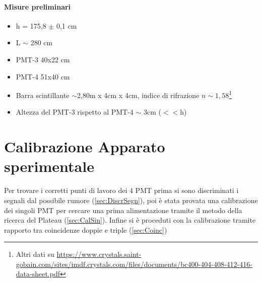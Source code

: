 \documentclass[a4paper]{article}
\begin{document}
\paragraph{Misure preliminari}
\begin{itemize}
\item h = 175,8 $\pm$ 0,1 cm
\item L $\sim$ 280 cm
\item PMT-3 40x22 cm
\item PMT-4 51x40 cm
\item Barra scintillante $\sim$2,80m x 4cm x 4cm, indice di rifrazione $n\sim 1,58$\footnote{Altri dati su \url{https://www.crystals.saint-gobain.com/sites/imdf.crystals.com/files/documents/bc400-404-408-412-416-data-sheet.pdf}}
\item Altezza del PMT-3 rispetto al PMT-4 $\sim$ 3cm ($<<$h)
\end{itemize}

\section{Calibrazione Apparato sperimentale}
Per trovare i corretti punti di lavoro dei 4 PMT prima si sono discriminati i segnali dal possibile rumore (\ref{sec:DiscrSegn}), poi è stata provata una calibrazione dei singoli PMT per cercare una prima alimentazione tramite il metodo della ricerca del Plateau (\ref{sec:CalSin}). Infine si è proceduti con la calibrazione tramite rapporto tra coincidenze doppie e triple (\ref{sec:Coinc})
\end{document}
